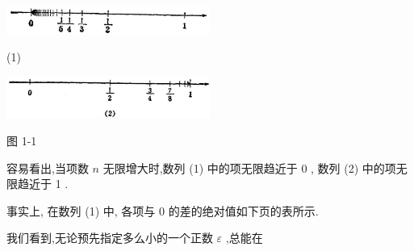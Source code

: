 \documentclass[lang=cn,newtx,10pt,scheme=chinese]{elegantbook}
\begin{document}
\begin{center}
	\includegraphics[width=0.5\textwidth]{images/01912c18-5c3f-733d-b775-749ba9897a9d_4_159408.jpg}

\end{center}

\begin{center}
	(1)
\end{center}


\begin{center}
	\includegraphics[width=0.5\textwidth]{images/01912c18-5c3f-733d-b775-749ba9897a9d_4_459236.jpg}
\end{center}

图 1-1

容易看出,当项数 \(n\) 无限增大时,数列 (1) 中的项无限趋近于 0 , 数列 (2) 中的项无限趋近于 1 .

事实上, 在数列 (1) 中, 各项与 0 的差的绝对值如下页的表所示.

我们看到,无论预先指定多么小的一个正数 \(\varepsilon\) ,总能在

\begin{center}
\end{center}
\end{document}
